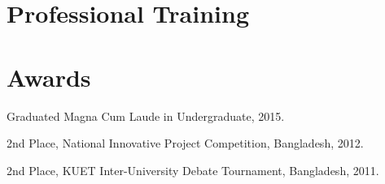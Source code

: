 
\newpage %

\begin{minipage}[t]{0.32\textwidth} %

\sectionspace

\section{Professional Training}

\vspace{\topsep} %

\vspace{\topsep} %

\sectionspace

\section{Awards}
\vspace{\topsep} %
\begin{tightitemize}
    \item Graduated Magna Cum Laude in Undergraduate, 2015.
    \item 2nd Place, National Innovative Project Competition, Bangladesh, 2012.
    \item 2nd Place, KUET Inter-University Debate Tournament, Bangladesh, 2011.
    
\end{tightitemize}


\end{minipage} %
\hfill
